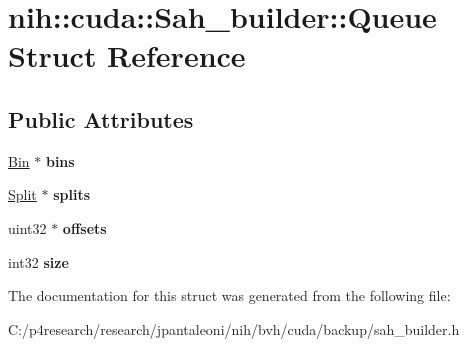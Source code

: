 \hypertarget{structnih_1_1cuda_1_1_sah__builder_1_1_queue}{
\section{nih\-:\-:cuda\-:\-:\-Sah\-\_\-builder\-:\-:\-Queue \-Struct \-Reference}
\label{structnih_1_1cuda_1_1_sah__builder_1_1_queue}
}
\subsection*{\-Public \-Attributes}
\begin{DoxyCompactItemize}
\item 
\hypertarget{structnih_1_1cuda_1_1_sah__builder_1_1_queue_afeb7261cf5ee3d888c67f3a0fdda3cad}{
\hyperlink{structnih_1_1cuda_1_1_sah__builder_1_1_bin}{\-Bin} $\ast$ {\bfseries bins}}
\label{structnih_1_1cuda_1_1_sah__builder_1_1_queue_afeb7261cf5ee3d888c67f3a0fdda3cad}

\item 
\hypertarget{structnih_1_1cuda_1_1_sah__builder_1_1_queue_a55fce2cbbb5389fa0d82b2c4e5d1653a}{
\hyperlink{structnih_1_1cuda_1_1_sah__builder_1_1_split}{\-Split} $\ast$ {\bfseries splits}}
\label{structnih_1_1cuda_1_1_sah__builder_1_1_queue_a55fce2cbbb5389fa0d82b2c4e5d1653a}

\item 
\hypertarget{structnih_1_1cuda_1_1_sah__builder_1_1_queue_a3ddbfa702fc7e03059ce26c59e121011}{
uint32 $\ast$ {\bfseries offsets}}
\label{structnih_1_1cuda_1_1_sah__builder_1_1_queue_a3ddbfa702fc7e03059ce26c59e121011}

\item 
\hypertarget{structnih_1_1cuda_1_1_sah__builder_1_1_queue_a171ed77d5b868345a6f1c6207b662316}{
int32 {\bfseries size}}
\label{structnih_1_1cuda_1_1_sah__builder_1_1_queue_a171ed77d5b868345a6f1c6207b662316}

\end{DoxyCompactItemize}


\-The documentation for this struct was generated from the following file\-:\begin{DoxyCompactItemize}
\item 
\-C\-:/p4research/research/jpantaleoni/nih/bvh/cuda/backup/sah\-\_\-builder.\-h\end{DoxyCompactItemize}

